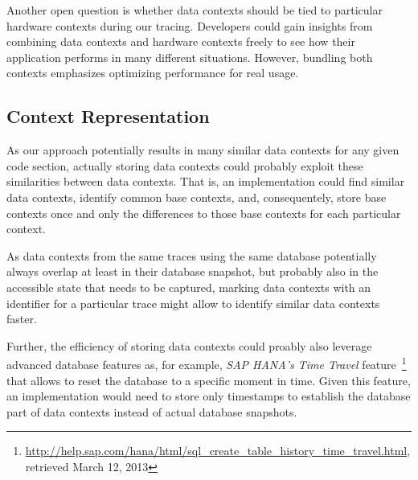 Another open question is whether data contexts should be tied to particular hardware contexts during our tracing.
Developers could gain insights from combining data contexts and hardware contexts freely to see how their application performs in many different situations.
However, bundling both contexts emphasizes optimizing performance for real usage.

\subsection{Context Representation}
As our approach potentially results in many similar data contexts for any given code section, actually storing data contexts could probably exploit these similarities between data contexts.
That is, an implementation could find similar data contexts, identify common base contexts, and, consequentely, store base contexts once and only the differences to those base contexts for each particular context.

As data contexts from the same traces using the same database potentially always overlap at least in their database snapshot, but probably also in the accessible state that needs to be captured, marking data contexts with an identifier for a particular trace might allow to identify similar data contexts faster.

Further, the efficiency of storing data contexts could proably also leverage advanced database features as, for example, \emph{SAP HANA's Time Travel} feature~\footnote{\url{http://help.sap.com/hana/html/sql_create_table_history_time_travel.html}, retrieved March 12, 2013} that allows to reset the database to a specific moment in time.
Given this feature, an implementation would need to store only timestamps to establish the database part of data contexts instead of actual database snapshots.
